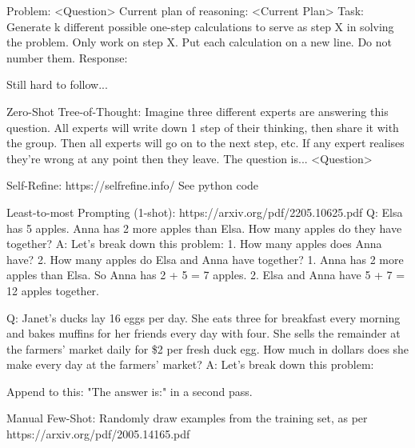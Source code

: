 \documentclass[11pt]{article}
\begin{document}
Problem:
<Question> 
Current plan of reasoning:
<Current Plan>
Task:
Generate {k} different possible one-step calculations to serve as step {X} in solving the problem. Only work on step {X}. Put each calculation on a new line. Do not number them.
Response:

Still hard to follow...

Zero-Shot Tree-of-Thought:
Imagine three different experts are answering this question.
All experts will write down 1 step of their thinking,
then share it with the group.
Then all experts will go on to the next step, etc.
If any expert realises they're wrong at any point then they leave.
The question is...
<Question>

Self-Refine: https://selfrefine.info/
See python code

Least-to-most Prompting (1-shot): https://arxiv.org/pdf/2205.10625.pdf
Q: Elsa has 5 apples. Anna has 2 more apples than Elsa. How many apples do they have together?
A: Let's break down this problem: 1. How many apples does Anna have? 2. How many apples do Elsa and Anna have together?
1. Anna has 2 more apples than Elsa. So Anna has 2 + 5 = 7 apples.
2. Elsa and Anna have 5 + 7 = 12 apples together.

Q: Janet's ducks lay 16 eggs per day. She eats three for breakfast every morning and bakes muffins for her friends every day with four. She sells the remainder at the farmers' market daily for \$2 per fresh duck egg. How much in dollars does she make every day at the farmers' market?
A: Let's break down this problem:

Append to this: "The answer is:" in a second pass.

Manual Few-Shot:
Randomly draw examples from the training set, as per https://arxiv.org/pdf/2005.14165.pdf
\end{document}
